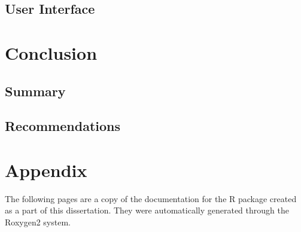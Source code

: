 \documentclass[11pt, a4paper, oneside]{report}
\begin{document}
\section{User Interface}
\label{sec:user-interface}

\chapter{Conclusion}
\label{cha:conclusion}

\section{Summary}
\label{sec:summary}


\section{Recommendations}
\label{sec:recommendations}




\chapter{Appendix}
\label{cha:appendix}

The following pages are a copy of the documentation for the R package
created as a part of this dissertation. They were automatically
generated through the Roxygen2 system.



{}
\printglossaries
{}
\printindex
{}
\printbibliography
\end{document}

